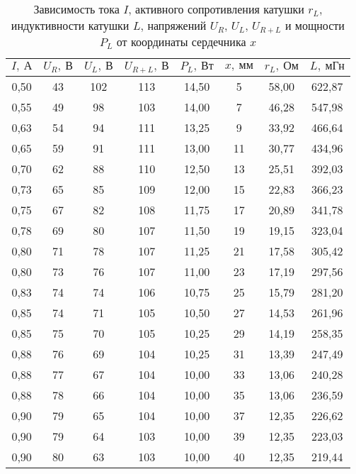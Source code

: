 \renewcommand{\arraystretch}{1.2} 
\begin{table}[H]
\centering
\begin{tabular}{|c|c|c|c|c|c|c|c|}
\hline
$I, \ \text{А}$    & $U_R, \ \text{В}$ &
$U_L, \ \text{В}$& $U_{R+L}, \ \text{В}$
& $P_L, \ \text{Вт}$   & $x, \
\text{мм}$  & $r_L, \ \text{Ом}$    & $L,\
\text{мГн}$    \\ \hline
0,50 & 43 & 102 & 113 & 14,50 & 5  & 58,00 & 622,87 \\ \hline
0,55 & 49 & 98  & 103 & 14,00 & 7  & 46,28 & 547,98 \\ \hline
0,63 & 54 & 94  & 111 & 13,25 & 9  & 33,92 & 466,64 \\ \hline
0,65 & 59 & 91  & 111 & 13,00 & 11 & 30,77 & 434,96 \\ \hline
0,70 & 62 & 88  & 110 & 12,50 & 13 & 25,51 & 392,03 \\ \hline
0,73 & 65 & 85  & 109 & 12,00 & 15 & 22,83 & 366,23 \\ \hline
0,75 & 67 & 82  & 108 & 11,75 & 17 & 20,89 & 341,78 \\ \hline
0,78 & 69 & 80  & 107 & 11,50 & 19 & 19,15 & 323,04 \\ \hline
0,80 & 71 & 78  & 107 & 11,25 & 21 & 17,58 & 305,42 \\ \hline
0,80 & 73 & 76  & 107 & 11,00 & 23 & 17,19 & 297,56 \\ \hline
0,83 & 74 & 74  & 106 & 10,75 & 25 & 15,79 & 281,20 \\ \hline
0,85 & 74 & 71  & 105 & 10,50 & 27 & 14,53 & 261,96 \\ \hline
0,85 & 75 & 70  & 105 & 10,25 & 29 & 14,19 & 258,35 \\ \hline
0,88 & 76 & 69  & 104 & 10,25 & 31 & 13,39 & 247,49 \\ \hline
0,88 & 77 & 67  & 104 & 10,00 & 33 & 13,06 & 240,28 \\ \hline
0,88 & 78 & 66  & 104 & 10,00 & 35 & 13,06 & 236,59 \\ \hline
0,90 & 79 & 65  & 104 & 10,00 & 37 & 12,35 & 226,62 \\ \hline
0,90 & 79 & 64  & 103 & 10,00 & 39 & 12,35 & 223,03 \\ \hline
0,90 & 80 & 63  & 103 & 10,00 & 40 & 12,35 & 219,44 \\ \hline
\end{tabular}
\captionsetup{justification = centering}
\caption{Зависимость тока $I$, активного
сопротивления катушки  $r_L$,
индуктивности катушки  $L$, напряжений
 $U_R$, $U_L$, $U_{R+L}$ и мощности
 $P_L$ от координаты сердечника $x$}
\end{table}

